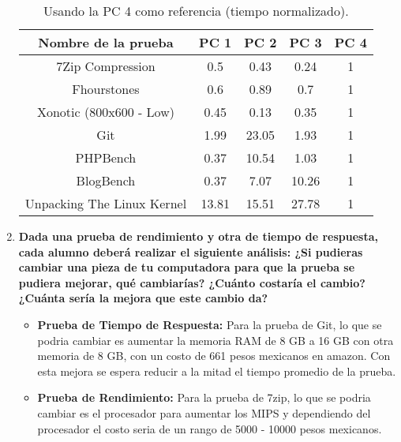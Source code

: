 \documentclass[12pt]{article}
\newcommand{\pl}[1]{\item \textbf{ #1 }}
\begin{document}
\begin{enumerate}[label=(\arabic{section}.\arabic{subsection}.\arabic{enumi})]
    \begin{table}[htb]
        \centering
        \begin{tabular}{|c|c|c|c|c|}
        \hline
        \textbf{Nombre de la prueba} & \textbf{PC 1} & \textbf{PC 2} & \textbf{PC 3} & \textbf{PC 4}\\
        \hline
        7Zip Compression & 0.5 & 0.43 & 0.24 & 1 \\
        \hline
        Fhourstones  & 0.6 & 0.89 & 0.7 & 1 \\
        \hline
        Xonotic (800x600 - Low) & 0.45 & 0.13 & 0.35 & 1 \\
        \hline
        Git & 1.99 & 23.05 & 1.93 & 1 \\
        \hline
        PHPBench & 0.37 & 10.54 & 1.03 & 1 \\
        \hline
        BlogBench & 0.37  & 7.07 & 10.26 & 1 \\
        \hline
        Unpacking The Linux Kernel & 13.81 & 15.51 & 27.78 & 1  \\
        \hline
        \end{tabular}
        \caption{Usando la PC 4 como referencia (tiempo normalizado).}
    \end{table}

    \pl{Dada una prueba de rendimiento y otra de tiempo de respuesta, cada alumno deberá realizar el siguiente análisis: ¿Si pudieras cambiar una pieza de tu computadora para que la prueba se pudiera mejorar, qué cambiarías? ¿Cuánto costaría el cambio? ¿Cuánta sería la mejora que este cambio da?}
    
    \begin{itemize}
        \item \textbf{Prueba de Tiempo de Respuesta:} 
        Para la prueba de Git, lo que se podria cambiar es aumentar la memoria RAM de 8 GB a 16 GB con otra memoria de 8 GB, con un costo de 661 pesos mexicanos en amazon.  Con esta mejora se espera reducir a la mitad el tiempo promedio de la prueba.
        \item \textbf{Prueba de Rendimiento:}
        Para la prueba de 7zip, lo que se podria cambiar es el procesador para aumentar los MIPS y dependiendo del procesador el costo seria de un rango de 5000 - 10000 pesos mexicanos.
    \end{itemize}
\end{enumerate}

\newpage
\end{document}
